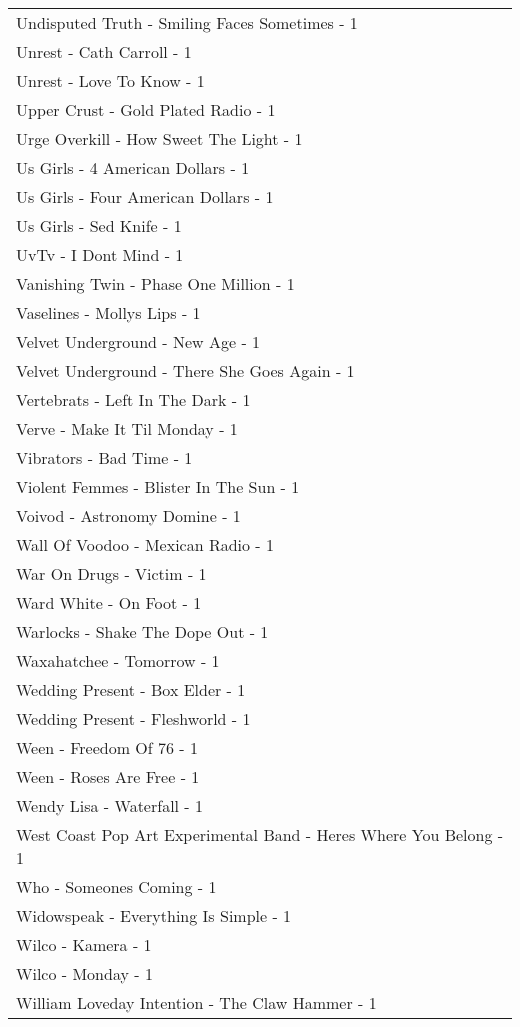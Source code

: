 \documentclass[
]{article}
\begin{document}
\begin{longtable}{l}
Undisputed Truth - Smiling Faces Sometimes - 1 \\ 
Unrest - Cath Carroll - 1 \\ 
Unrest - Love To Know - 1 \\ 
Upper Crust - Gold Plated Radio - 1 \\ 
Urge Overkill - How Sweet The Light - 1 \\ 
Us Girls - 4 American Dollars - 1 \\ 
Us Girls - Four American Dollars - 1 \\ 
Us Girls - Sed Knife - 1 \\ 
UvTv - I Dont Mind - 1 \\ 
Vanishing Twin - Phase One Million - 1 \\ 
Vaselines - Mollys Lips - 1 \\ 
Velvet Underground - New Age - 1 \\ 
Velvet Underground - There She Goes Again - 1 \\ 
Vertebrats - Left In The Dark - 1 \\ 
Verve - Make It Til Monday - 1 \\ 
Vibrators - Bad Time - 1 \\ 
Violent Femmes - Blister In The Sun - 1 \\ 
Voivod - Astronomy Domine - 1 \\ 
Wall Of Voodoo - Mexican Radio - 1 \\ 
War On Drugs - Victim - 1 \\ 
Ward White - On Foot - 1 \\ 
Warlocks - Shake The Dope Out - 1 \\ 
Waxahatchee - Tomorrow - 1 \\ 
Wedding Present - Box Elder - 1 \\ 
Wedding Present - Fleshworld - 1 \\ 
Ween - Freedom Of 76 - 1 \\ 
Ween - Roses Are Free - 1 \\ 
Wendy Lisa - Waterfall - 1 \\ 
West Coast Pop Art Experimental Band - Heres Where You Belong - 1 \\ 
Who - Someones Coming - 1 \\ 
Widowspeak - Everything Is Simple - 1 \\ 
Wilco - Kamera - 1 \\ 
Wilco - Monday - 1 \\ 
William Loveday Intention - The Claw Hammer - 1 \\ 

\end{longtable}
\end{document}
